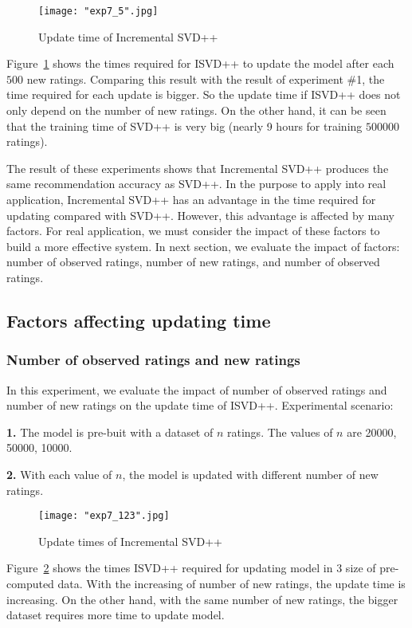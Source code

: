 \documentclass[oneside,13pt]{extreport}
\begin{document}
\clearpage
\begin{figure}[h!]
    \centering
    \texttt{[image: "exp7\_5".jpg]} 
    \caption{ Update time of Incremental SVD++}
    \label{fig:exp7_5}
\end{figure}
Figure~\ref{fig:exp7_5} shows the times required for ISVD++ to update the model after each $500$ new ratings. Comparing this result with the result of experiment \#1, the time required for each update is bigger. So the update time if ISVD++ does not only depend on the number of new ratings. On the other hand, it can be seen that the training time of SVD++ is very big (nearly 9 hours for training $500000$ ratings).

The result of these experiments shows that Incremental SVD++ produces the same recommendation accuracy as SVD++. In the purpose to apply into real application, Incremental SVD++ has an advantage in the time required for updating compared with SVD++. However, this advantage is affected by many factors. For real application, we must consider the impact of these factors to build a more effective system. In next section, we evaluate the impact of factors: number of observed ratings, number of new ratings, and number of observed ratings.


\subsection{Factors affecting updating time}
\subsubsection{Number of observed ratings and new ratings}
In this experiment, we evaluate the impact of number of observed ratings and number of new ratings on the update time of ISVD++. Experimental scenario: 
\begin{description}
    \item{\textbf{1.}} The model is pre-buit with a dataset of $n$ ratings. The values of $n$ are 20000, 50000, 10000.
    \item{\textbf{2.}} With each value of $n$, the model is updated with different number of new ratings. 
\end{description}
\clearpage
\begin{figure}[h!]
    \centering
    \texttt{[image: "exp7\_123".jpg]} 
    \caption{ Update times of Incremental SVD++}
    \label{fig:exp7_123}
\end{figure}
Figure~\ref{fig:exp7_123} shows the times ISVD++ required for updating model in 3 size of pre-computed data. With the increasing of number of new ratings, the update time is increasing. On the other hand, with the same number of new ratings, the bigger dataset requires more time to update model.
\end{document}
